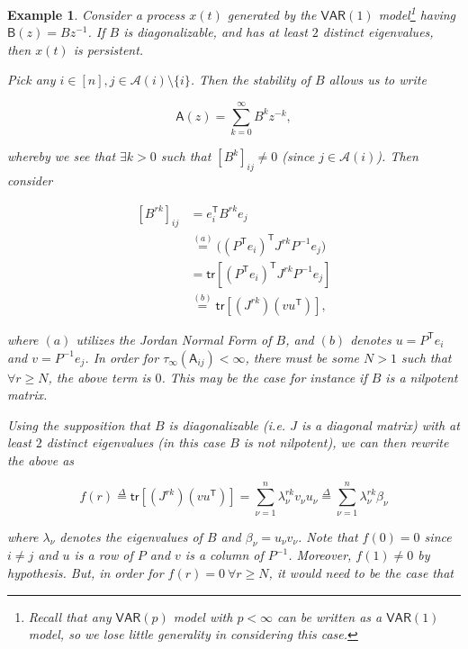 \documentclass{statsoc}
\def\VAR{\mathsf{VAR}}  %
\def\B{\mathsf{B}}  %
\def\A{\mathsf{A}}  %
\newcommand{\anc}[1]{\mathcal{A}(#1)}  %
\newtheorem{example}{Example}
\def\defeq{\overset{\Delta}{=}}  %
\def\tr{\mathsf{tr }}  %
\def\T{\mathsf{T}}  %
\begin{document}
\begin{example}
  Consider a process $x(t)$ generated by the $\VAR(1)$
  model\footnote{Recall that any $\VAR(p)$ model with $p < \infty$ can
    be written as a $\VAR(1)$ model, so we lose little generality in
    considering this case.}  having $\B(z) = Bz^{-1}$.  If $B$ is
  diagonalizable, and has at least $2$ distinct eigenvalues, then
  $x(t)$ is persistent.

  Pick any $i \in [n], j \in \anc{i} \setminus \{i\}$.  Then the
  stability of $B$ allows us to write

  \begin{equation*}
    \A(z) = \sum_{k = 0}^\infty B^k z^{-k},
  \end{equation*}

  whereby we see that $\exists k > 0$ such that $[B^k]_{ij} \ne 0$
  (since $j \in \anc{i}$).  Then consider

  \begin{equation*}
    \begin{aligned}
      [B^{rk}]_{ij} &= e_i^\T B^{rk} e_j \\
      &\overset{(a)}{=} \big((P^\T e_i)^\T J^{rk} P^{-1}e_j\big)\\
      &= \tr [(P^\T e_i)^\T J^{rk} P^{-1}e_j]\\
      &\overset{(b)}{=} \tr [(J^{rk}) (v u^\T)],
    \end{aligned}
  \end{equation*}

  where $(a)$ utilizes the Jordan Normal Form of $B$, and $(b)$
  denotes $u = P^\T e_i$ and $v = P^{-1}e_j$.  In order for
  $\tau_\infty(\A_{ij}) < \infty$, there must be some $N > 1$ such
  that $\forall r \ge N$, the above term is $0$.  This may be the case
  for instance if $B$ is a nilpotent matrix.  

  Using the supposition that $B$ is diagonalizable (i.e. $J$ is a
  diagonal matrix) with at least $2$ distinct eigenvalues (in this
  case $B$ is \textit{not} nilpotent), we can then rewrite the above
  as

  \begin{equation*}
    f(r) \defeq \tr [(J^{rk}) (v u^\T)] = \sum_{\nu = 1}^n \lambda_\nu ^{rk} v_\nu u_\nu \defeq \sum_{\nu = 1}^n \lambda_\nu^{rk} \beta_\nu
  \end{equation*}

  where $\lambda_\nu$ denotes the eigenvalues of $B$ and
  $\beta_\nu = u_\nu v_\nu$.  Note that $f(0) = 0$ since $i \ne j$ and
  $u$ is a row of $P$ and $v$ is a column of $P^{-1}$.  Moreover,
  $f(1) \ne 0$ by hypothesis.  But, in order for
  $f(r) = 0\ \forall r \ge N$, it would need to be the case that


\end{example}
\end{document}
